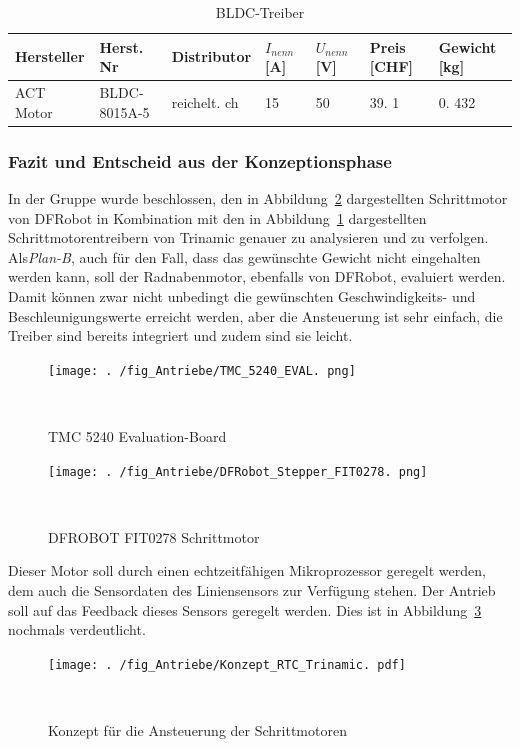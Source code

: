 \documentclass[main.  tex]{subfiles} %
\begin{document}
\begin{table}[h]
    \centering
    \begin{tabular}{|p{2cm}|p{3cm}|p{2cm}|p{1cm}|p{1cm}|p{1cm}|p{}|}
        \hline
        Hersteller & Herst.  Nr   & Distributor   & $I_{nenn} $ [A] & $U_{nenn}$ [V] & Preis [CHF] & Gewicht [kg] \\ \hline
        ACT Motor  & BLDC-8015A-5 & reichelt.  ch & 15              & 50             & 39.  1      & 0.  432      \\ \hline
    \end{tabular}
    \caption{BLDC-Treiber}
\end{table}

\subsubsection*{Fazit und Entscheid aus der Konzeptionsphase}  %

In der Gruppe wurde beschlossen, den in Abbildung~\ref{fig:DFROBOT_FIT0278}
dargestellten Schrittmotor von DFRobot in Kombination mit den in
Abbildung~\ref{fig:TMC5240_EVAL} dargestellten Schrittmotorentreibern von
Trinamic genauer zu analysieren und zu verfolgen. Als\textit{Plan-B}, auch für
den Fall, dass das gewünschte Gewicht nicht eingehalten werden kann, soll der
Radnabenmotor, ebenfalls von DFRobot, evaluiert werden. Damit können zwar nicht
unbedingt die gewünschten Geschwindigkeits- und Beschleunigungswerte erreicht
werden, aber die Ansteuerung ist sehr einfach, die Treiber sind bereits
integriert und zudem sind sie leicht.

\begin{figure}[h!]
    \centering
    \texttt{[image: .  /fig\_Antriebe/TMC\_5240\_EVAL.  png]}
    \caption{TMC 5240 Evaluation-Board}~\label{fig:TMC5240_EVAL}
\end{figure}

\begin{figure}[h!]
    \centering
    \texttt{[image: .  /fig\_Antriebe/DFRobot\_Stepper\_FIT0278.  png]}
    \caption{DFROBOT FIT0278 Schrittmotor}~\label{fig:DFROBOT_FIT0278}
\end{figure}

Dieser Motor soll durch einen echtzeitfähigen Mikroprozessor geregelt werden,
dem auch die Sensordaten des Liniensensors zur Verfügung stehen. Der Antrieb
soll auf das Feedback dieses Sensors geregelt werden. Dies ist in
Abbildung~\ref{fig:RTC_Trinamic_Konzept} nochmals verdeutlicht.
\begin{figure}[h!]
    \centering
    \texttt{[image: .  /fig\_Antriebe/Konzept\_RTC\_Trinamic.  pdf]}
    \caption{Konzept für die Ansteuerung der Schrittmotoren}~\label{fig:RTC_Trinamic_Konzept}
\end{figure}
\end{document}
